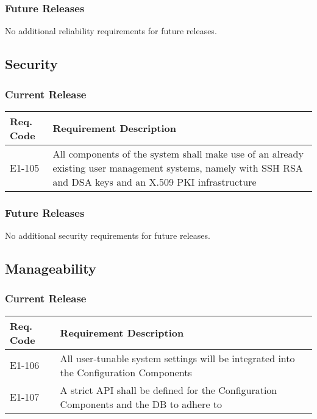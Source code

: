 \documentclass[12pt]{article}
\begin{document}
\subsubsection{Future Releases}
No additional reliability requirements for future releases.


\subsection{Security}

\subsubsection{Current Release}

\begin{center}
	\begin{tabular}{| p{2.5cm} | p{12.5cm} |}
		\hline
		\textbf{Req. Code} & \textbf{Requirement Description}\\
		\hline
		E1-105	& All components of the system shall make use of an already existing user
        management systems, namely with SSH RSA and DSA keys and an X.509 PKI infrastructure\\
		\hline
	\end{tabular}
	\label{tab:SecurityRequirements}
\end{center}

\subsubsection{Future Releases}
No additional security requirements for future releases.


\subsection{Manageability}

\subsubsection{Current Release}

\begin{center}
	\begin{tabular}{| p{2.5cm} | p{12.5cm} |}
		\hline
		\textbf{Req. Code} & \textbf{Requirement Description}\\
		\hline
		E1-106	& All user-tunable system settings will be integrated into the Configuration Components\\
        \hline
        E1-107  & A strict API shall be defined for the Configuration Components and the DB to adhere to\\
		\hline
	\end{tabular}
	\label{tab:ManageabilityRequirements}
\end{center}
\end{document}
